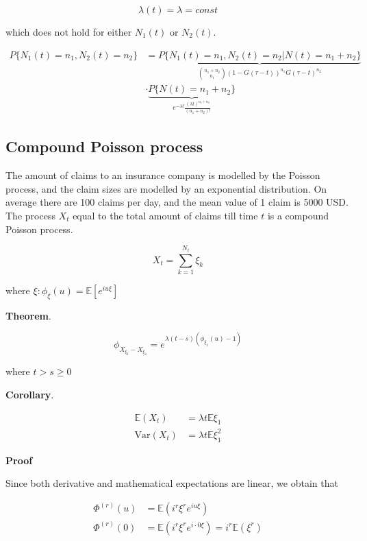 \documentclass[12pt]{article}
\theoremstyle{nonumberbreak}
\begin{document}
$$
\lambda(t) = \lambda = const
$$

which does not hold for either $N_1(t)$ or $N_2(t)$. 

$$
\begin{aligned}
P\{ N_1(t) = n_1,  N_2(t) = n_2 \} &= \underbrace{P\{ N_1(t) = n_1,  N_2(t) = n_2 | N(t) = n_1 + n_2 \}}_{\binom{n_1+n_2}{n_1} (1 - G(\tau -t))^{n_1} G(\tau -t)^{n_2} } \\[8pt]
&\cdot \underbrace{P\{ N(t) = n_1 + n_2 \}}_{e^{-\lambda t} \frac{(\lambda t)^{n_1 + n_2}}{(n_1+n_2)!}}
\end{aligned}
$$


\subsection{Compound Poisson process}

The amount of claims to an insurance company is modelled by the Poisson process, and the claim sizes are modelled by an exponential distribution. On average there are 100 claims per day, and the mean value of 1 claim is 5000 USD. The process $X_t$ equal to the total amount of claims till time $t$ is a compound Poisson process. 


$$
X_t = \sum_{k=1}^{N_t} \xi_k
$$

where $\xi: \phi_\xi (u) = \mathbb{E} [e^{iu\xi} ]$



\begin{theorem}
\textbf{Theorem}.

$$
\phi_{X_{\xi_t} - X_{\xi_s}} = e^{\lambda(t-s) \left( \phi_{\xi_1}(u) - 1 \right)}
$$

where $t > s \ge 0$

\textbf{Corollary}.

$$
\begin{aligned}
\mathbb{E}(X_t) &= \lambda t \mathbb{E} \xi_1 \\[8pt]
\mathrm{Var}(X_t) &= \lambda t \mathbb{E} \xi_1^2
\end{aligned}
$$


\end{theorem}


\textbf{Proof} 

Since both derivative and mathematical expectations are linear, we obtain that

$$
\begin{aligned}
\Phi^{(r)}(u) &= \mathbb{E}(i^r \xi^r e^{iu\xi}) \\[8pt]
\Phi^{(r)}(0) &= \mathbb{E}(i^r \xi^r e^{i\cdot 0 \xi}) = i^r \mathbb{E} (\xi^r)
\end{aligned}
$$
\end{document}
